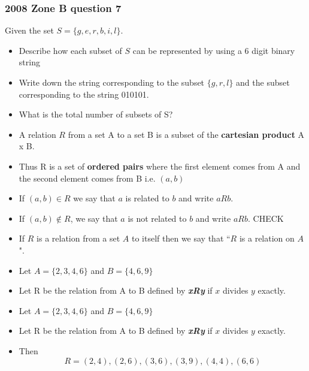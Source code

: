 \documentclass{article}
\begin{document}

\subsubsection*{2008 Zone B question 7}
Given the set $S =\{g,e,r,b,i,l\}$.
\begin{itemize}
\item Describe how each subset of $S$ can be represented by using a 6 digit binary string
\item Write down the string corresponding to the subset $\{g,r,l\}$ and the subset corresponding to the string 010101.
\item What is the total number of subsets of S?
\end{itemize}


\large
\begin{itemize}
\item A relation $R$ from a set A to a set B is a subset of the
\textbf{cartesian product} A x B. 
\item Thus R is a set of \textbf{ordered pairs} where
the first element comes from A and the second element comes
from B i.e. $(a, b)$
\end{itemize}

\large
\begin{itemize}

\item  If $(a, b) \in R$ we say that $a$ is related to $b$ and write $aRb$.
\item If $(a, b) \notin R$, we say that $a$ is not related to $b$ and write $aRb$. CHECK
\item If
$R$ is a relation from a set $A$ to itself then we say that ``$R$ is a relation
on $A$".

\item Let $A = \{2, 3, 4, 6\}$ and $B = \{4, 6, 9\}$
\item Let R be the relation from A to B defined by \textit{\textbf{xRy}} if $x$
divides $y$ exactly.


\item Let $A = \{2, 3, 4, 6\}$ and $B = \{4, 6, 9\}$
\item Let R be the relation from A to B defined by \textit{\textbf{xRy}} if $x$
divides $y$ exactly.
\item  Then
\[R = {(2, 4), (2, 6), (3, 6), (3, 9), (4, 4), (6, 6)}\]
\end{itemize}
\end{document}
